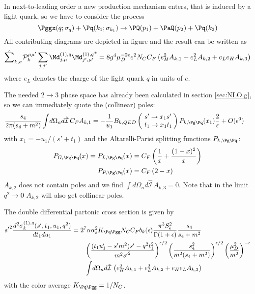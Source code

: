 In next-to-leading order a new production mechanism enters, that is induced by a light quark, so we have to consider the process
\begin{equation}
\Pggx(q;\sigma_q) + \Pq(k_1;\sigma_{k_1}) \rightarrow \PQ(p_1)+\PaQ(p_2) + \Pq(k_2)
\end{equation}
All contributing diagrams are depicted in figure  and the result can be written as
\begin{equation}
\hat\sum_{k,\sigma}\mathcal P_{k}^{\mu\mu'}\sum_{j,j'}{\Md^{(1),q}_{j,\mu}\Md^{(1),q}_{j',\mu'}}^* = 8g^4\mu_D^{-2\epsilon}e^2 N_C C_F\left( e_H^2 A_{k,1} +  e_L^2 A_{k,2} +  e_L e_H A_{k,3} \right)
\end{equation}
where $e_L$ denotes the charge of the light quark $q$ in units of $e$.

The needed $2\rightarrow 3$ phase space has already been calculated in section \ref{sec:NLO.g}, so we can immediately quote the (collinear) poles:
\begin{align}
\frac{s_4}{2\pi(s_4+m^2)}\int\!d\Omega_n d\hat{\mathcal I}\,C_F A_{k,1} &=-\frac 1 {u_1}B_{k,QED}\left(\!\begin{array}{l}s'\rightarrow x_1s'\\t_1\rightarrow x_1 t_1\end{array}\!\!\right) P_{k,\Pg\Pq}(x_1)\frac 2 \epsilon + O(\epsilon^0)
\end{align}
with $x_1 = -u_1/(s'+t_1)$ and the Altarelli-Parisi splitting functions $P_{k,\Pg\Pq}$\cite{Altarelli:1977zs,Vogelsang:1995vh}:
\begin{align}
P_{G,\Pg\Pq}(x) = P_{L,\Pg\Pq}(x) &= C_F\left(\frac 1 x + \frac {(1-x)^2} x\right)\\
P_{P,\Pg\Pq}(x) &= C_F\left(2-x\right)
\end{align}
$A_{k,2}$ does not contain poles and we find $\int\!d\Omega_n d\hat{\mathcal I}\,A_{k,3}=0$. Note that in the limit $q^2\rightarrow 0$ $A_{k,2}$ will also get collinear poles.


The double differential partonic cross section is given by
\begin{align}
{s'}^2\frac{d^2\sigma_{k}^{(1),q}(s',t_1,u_1,q^2)}{dt_1du_1} &= 2^7\alpha\alpha_s^2 K_{\Pq\Pgg}N_CC_Fb_k(\epsilon)\frac{\pi^3 S_\epsilon^2}{\Gamma(1+\epsilon)} \frac{s_4}{s_4+m^2}  \nonumber\\
 &\hspace{20pt} \left(\frac{(t_1u_1'-s'm^2)s' - q^2t_1^2}{m^2{s'}^2}\right)^{\epsilon/2} \left(\frac{s_4^2}{m^2(s_4+m^2)}\right)^{\epsilon/2} \left(\frac{\mu_D^2}{m^2}\right)^{-\epsilon} \nonumber\\
 &\hspace{20pt} \int\!d\Omega_n d\hat{\mathcal I}\,\left(e_H^2 A_{k,1} + e_L^2 A_{k,2} + e_H e_L A_{k,3} \right)
\end{align}
with the color average $K_{\Pq\Pgg} = 1/N_C$.
